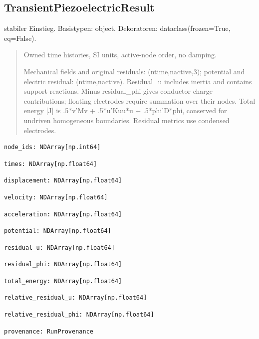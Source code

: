 \subsection{TransientPiezoelectricResult}
stabiler Einstieg.
Basistypen: object. Dekoratoren: dataclass(frozen=True, eq=False).
\begin{quote}
Owned time histories, SI units, active-node order, no damping.\par Mechanical fields and original residuals: (ntime,nactive,3); potential and electric residual: (ntime,nactive). Residual\_u includes inertia and contains support reactions. Minus residual\_phi gives conductor charge contributions; floating electrodes require summation over their nodes. Total energy [J] is .5*v'Mv + .5*u'Kuu*u + .5*phi'D*phi, conserved for undriven homogeneous boundaries. Residual metrics use condensed electrodes.
\end{quote}
\begin{lstlisting}
node_ids: NDArray[np.int64]
\end{lstlisting}
\begin{lstlisting}
times: NDArray[np.float64]
\end{lstlisting}
\begin{lstlisting}
displacement: NDArray[np.float64]
\end{lstlisting}
\begin{lstlisting}
velocity: NDArray[np.float64]
\end{lstlisting}
\begin{lstlisting}
acceleration: NDArray[np.float64]
\end{lstlisting}
\begin{lstlisting}
potential: NDArray[np.float64]
\end{lstlisting}
\begin{lstlisting}
residual_u: NDArray[np.float64]
\end{lstlisting}
\begin{lstlisting}
residual_phi: NDArray[np.float64]
\end{lstlisting}
\begin{lstlisting}
total_energy: NDArray[np.float64]
\end{lstlisting}
\begin{lstlisting}
relative_residual_u: NDArray[np.float64]
\end{lstlisting}
\begin{lstlisting}
relative_residual_phi: NDArray[np.float64]
\end{lstlisting}
\begin{lstlisting}
provenance: RunProvenance
\end{lstlisting}
